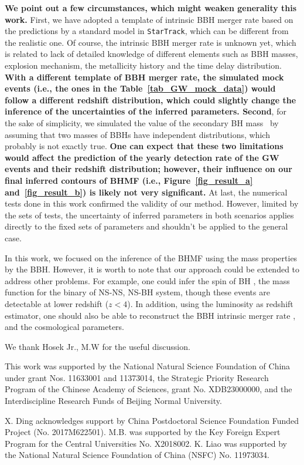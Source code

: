 \documentclass[twocolumn]{aastex62}
\begin{document}
{\bf We point out a few circumstances, which might weaken generality this work.} First, we have adopted a template of intrinsic BBH merger rate based on the predictions by a standard model in {\tt StarTrack}, which can be different from the realistic one. Of course, the intrinsic BBH merger rate is unknown yet, which is related to lack of detailed knowledge of different elements such as BBH masses, explosion mechanism, the metallicity history and the time delay distribution. {\bf With a different template of BBH merger rate, the simulated mock events (i.e., the ones in the Table~\ref{tab_GW_mock_data}) would follow a different redshift distribution, which could slightly change the inference of the uncertainties of the inferred parameters. Second}, for the sake of simplicity, we simulated the value of the secondary BH mass \mtwo\ by assuming that two masses of BBHs have independent distributions, which probably is not exactly true. {\bf One can expect that these two limitations would affect the prediction of the yearly detection rate of the GW events and their redshift distribution; however, their influence on our final inferred contours of BHMF (i.e., Figure~\ref{fig_result_a} and~\ref{fig_result_b}) is likely not very significant.} 
At last, the numerical tests done in this work confirmed the validity of our method. However, limited by the sets of tests, the uncertainty of inferred parameters  in both scenarios applies directly to the fixed sets of parameters and shouldn't be applied to the general case.

In this work, we focused on the inference of the BHMF using the mass properties by the BBH. However, it is worth to note that our approach could be extended to address other problems. For example, one could infer the spin of BH \citep{Abbott2018b}, the mass function for the binary of NS-NS, NS-BH system, though these events are detectable at lower redshift ($z<4$). In addition, using the luminosity as redshift estimator, one should also be able to reconstruct the BBH intrinsic merger rate \citep{Fishbach2018}, and the cosmological parameters.


\acknowledgments
We thank Hosek Jr., M.W for the useful discussion.

This work was supported by the National Natural Science Foundation of China under grant Nos. 11633001 and 11373014, the Strategic Priority Research Program of the Chinese Academy of Sciences, grant No. XDB23000000, and the Interdiscipline Research Funds of Beijing Normal University.

X. Ding acknowledges support by China Postdoctoral Science Foundation Funded Project (No. 2017M622501).
M.B. was supported by the Key Foreign Expert Program for the Central Universities No. X2018002.
K. Liao was supported by the National Natural Science Foundation of China (NSFC) No. 11973034.
\end{document}
